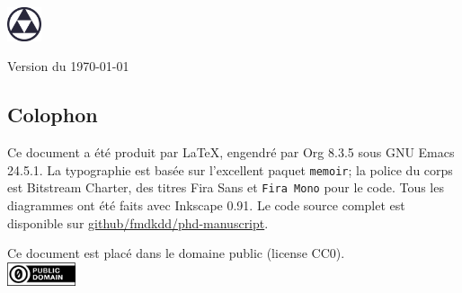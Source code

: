 \vspace{3cm}
\begin{flushright}
{\large\theauthor}
\end{flushright}

\vfill
\begin{center}
\includegraphics[width=1cm]{img/logo}
\end{center}

\vfill
\begin{center}
Version \versiontag{} du \today
\end{center}


\cleartoverso
\phantom{a}                     %
\vfill
\begin{minipage}{26pc}
\subsection*{Colophon}
Ce document a été produit par \LaTeX{}, engendré par Org 8.3.5 sous GNU Emacs
24.5.1.  La typographie est basée sur l'excellent paquet \texttt{memoir}; la
police du corps est Bitstream Charter, des titres \textsf{Fira Sans}
et \texttt{Fira Mono} pour le code.  Tous les diagrammes ont été faits avec
Inkscape 0.91.  Le code source complet est disponible sur
\href{https://github.com/fmdkdd/phd-manuscript}{github/fmdkdd/phd-manuscript}.

\vfill
\begin{center}
Ce document est placé dans le domaine public (license CC0).\\
\vspace{4pt}
\includegraphics[width=2cm]{img/cc-zero.png}
\end{center}
\end{minipage}

